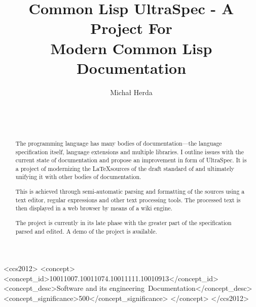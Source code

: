 \documentclass{sig-alternate-05-2015}
\def\inputtex#1{}
\begin{document}
\title{Common Lisp UltraSpec - A Project For \\ Modern Common Lisp Documentation}
\author{\alignauthor
Michał Herda\\
\\
\\
\\
}


\maketitle

\begin{abstract}
The \cl{} programming language has many bodies of documentation---the language specification \cite{ANSI:1994:standard} itself, language extensions and multiple libraries. I outline issues with the current state of \cl{} documentation and propose an improvement in form of \cl{} UltraSpec. It is a project of modernizing the \LaTeX sources of the draft standard \cite{ANSI:1994:draft} of \cl{} and ultimately unifying it with other bodies of \cl{} documentation.

This is achieved through semi-automatic parsing and formatting of the sources using a text editor, regular expressions and other text processing tools. The processed text is then displayed in a web browser by means of a wiki engine.

The project is currently in its late phase with the greater part of the specification parsed and edited. A demo of the project is available.
\end{abstract}

\begin{CCSXML}
<ccs2012>
<concept>
<concept_id>10011007.10011074.10011111.10010913</concept_id>
<concept_desc>Software and its engineering~Documentation</concept_desc>
<concept_significance>500</concept_significance>
</concept>
</ccs2012>
\end{CCSXML}


\printccsdesc


\inputtex{sec-introduction.tex}
\inputtex{sec-previous-work.tex}
\inputtex{sec-my-work.tex}
\inputtex{sec-conclusions-and-future-work.tex}



\end{document}
